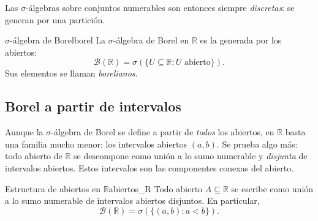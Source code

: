 \documentclass[11pt, a4paper]{article}
\begin{document}
\obs Las $\sigma$-álgebras sobre conjuntos numerables son entonces siempre \emph{discretas}: se
generan por una partición.

\begin{definicion}{$\sigma$-álgebra de Borel}{borel}
La $\sigma$-álgebra de Borel en $\mathbb{R}$ es la generada por los abiertos:
$$ \mathcal{B}(\mathbb{R}) = \sigma(\{U \subseteq \mathbb{R} : U \text{ abierto}\}). $$
Sus elementos se llaman \emph{borelianos}.
\end{definicion}

\subsection{Borel a partir de intervalos}

Aunque la $\sigma$-álgebra de Borel se define a partir de \emph{todos} los abiertos, en
$\mathbb{R}$ basta una familia mucho menor: los intervalos abiertos $(a, b)$. Se prueba algo más:
todo abierto de $\mathbb{R}$ se descompone como unión a lo sumo numerable y \emph{disjunta} de
intervalos abiertos. Estos intervalos son las componentes conexas del abierto.

\begin{proposicion}{Estructura de abiertos en $\mathbb{R}$}{abiertos_R}
Todo abierto $A \subseteq \mathbb{R}$ se escribe como unión a lo sumo numerable de intervalos
abiertos disjuntos. En particular,
$$ \mathcal{B}(\mathbb{R}) = \sigma(\{(a, b) : a < b\}). $$
\end{proposicion}
\end{document}
